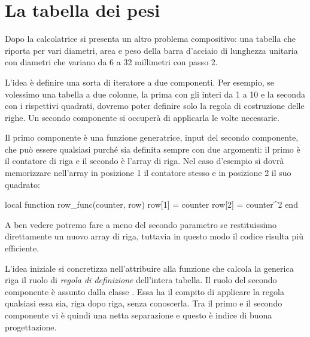 

\chapter{La tabella dei pesi}
\label{iChTabellaPesi}

Dopo la calcolatrice si presenta un altro problema compositivo: una tabella che
riporta per vari diametri, area e peso della barra d'acciaio di lunghezza
unitaria con diametri che variano da 6 a 32 millimetri con passo 2.

L'idea è definire una sorta di iteratore a due componenti. Per esempio, se
volessimo una tabella a due colonne, la prima con gli interi da 1 a 10 e la
seconda con i rispettivi quadrati, dovremo poter definire solo la regola di
costruzione delle righe. Un secondo componente si occuperà di applicarla le
volte necessarie.

Il primo componente è una funzione generatrice, input del secondo componente,
che può essere qualsiasi purché sia definita sempre con due argomenti: il primo
è il contatore di riga e il secondo è l'array di riga. Nel caso d'esempio si
dovrà memorizzare nell'array in posizione 1 il contatore stesso e in posizione 2
il suo quadrato:
\begin{lines}
local function row_func(counter, row)
    row[1] = counter
    row[2] = counter^2
end
\end{lines}

A ben vedere potremo fare a meno del secondo parametro  se
restituissimo direttamente un nuovo array di riga, tuttavia in questo modo il
codice risulta più efficiente.

L'idea iniziale si concretizza nell'attribuire alla funzione che calcola la
generica riga il ruolo di \emph{regola di definizione} dell'intera tabella.
Il ruolo del secondo componente è assunto dalla classe . Essa ha il
compito di applicare la regola qualsiasi essa sia, riga dopo riga, senza
conoscerla. Tra il primo e il secondo componente vi è quindi una netta
separazione e questo è indice di buona progettazione.


